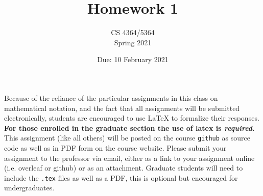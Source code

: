 \documentclass[11pt, oneside]{article}   	%
\title{Homework 1}
\author{CS 4364/5364\\Spring 2021}
\date{Due: 10 February 2021}							%
\begin{document}
\maketitle

Because of the reliance of the particular assignments in this class on mathematical notation, 
and the fact that all assignments will be submitted electronically, 
students are encouraged to use \LaTeX{} to formalize their responses. 
\textbf{For those enrolled in the graduate section the use of latex is \emph{required}.}
This assignment (like all others) will be posted on the course \texttt{github} as source code as well as in PDF form on the course website. 
Please submit your assignment to the professor via email, either as a link to your assignment online (i.e. overleaf or github) or as an attachment. 
Graduate students will need to include the \texttt{.tex} files as well as a PDF, this is optional but encouraged for undergraduates. 
\end{document}

